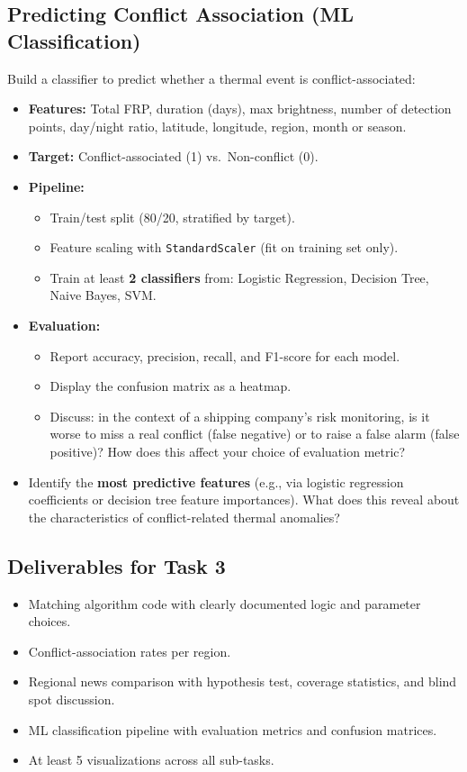 \documentclass[11pt]{article}
\begin{document}
\subsection{Predicting Conflict Association (ML Classification)}
Build a classifier to predict whether a thermal event is conflict-associated:
\begin{itemize}
  \item \textbf{Features:} Total FRP, duration (days), max brightness, number of detection points, day/night ratio, latitude, longitude, region, month or season.
  \item \textbf{Target:} Conflict-associated (1) vs.\ Non-conflict (0).
  \item \textbf{Pipeline:}
  \begin{itemize}
    \item Train/test split (80/20, stratified by target).
    \item Feature scaling with \texttt{StandardScaler} (fit on training set only).
    \item Train at least \textbf{2 classifiers} from: Logistic Regression, Decision Tree, Naive Bayes, SVM.
  \end{itemize}
  \item \textbf{Evaluation:}
  \begin{itemize}
    \item Report accuracy, precision, recall, and F1-score for each model.
    \item Display the confusion matrix as a heatmap.
    \item Discuss: in the context of a shipping company's risk monitoring, is it worse to miss a real conflict (false negative) or to raise a false alarm (false positive)? How does this affect your choice of evaluation metric?
  \end{itemize}
  \item Identify the \textbf{most predictive features} (e.g., via logistic regression coefficients or decision tree feature importances). What does this reveal about the characteristics of conflict-related thermal anomalies?
\end{itemize}

\subsection{Deliverables for Task 3}
\begin{itemize}
  \item Matching algorithm code with clearly documented logic and parameter choices.
  \item Conflict-association rates per region.
  \item Regional news comparison with hypothesis test, coverage statistics, and blind spot discussion.
  \item ML classification pipeline with evaluation metrics and confusion matrices.
  \item At least 5 visualizations across all sub-tasks.
\end{itemize}
\end{document}
